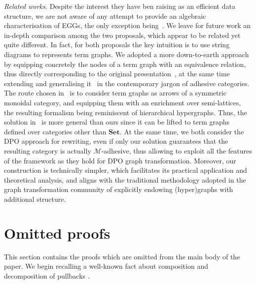 \documentclass[3p]{elsarticle}
\newcommand{\Set}{\mathbf{Set}}
\theoremstyle{remark}
\theoremstyle{definition}
\begin{document}
\emph{Related works.}
Despite the interest they have ben raising as an efficient data structure, we are not aware of any attempt to provide an 
algebraic characterisation of EGGs, the only exception being~\cite{ghica}. We leave for future work an in-depth comparison 
among the two proposals, which appear to be related yet quite different.
%
In fact, for both proposals the key intuition is  to use string diagrams to represents term graphs. We adopted a
more down-to-earth approach by equipping
concretely the nodes of a term graph with an equivalence relation, thus directly corresponding to the original presentation~\cite{DetlefsNS05},
at the same time extending and generalising it~\cite{concur2006} in the contemporary jargon of adhesive categories. 
The route chosen in~\cite{ghica} is to consider term graphs as arrows of a symmetric monoidal category,
and equipping them with an enrichment over semi-lattices, the resulting formalism being reminiscent of hierarchical hypergraphs.
Thus, the solution in~\cite{ghica}  is  more general than ours since it can be lifted to term graphs defined over categories other than
$\Set$. At the same time, we both consider the DPO approach for rewriting, even if only our solution guarantees that the resulting category
is actually $\mathcal{M}$-adhesive, thus allowing to exploit all the features of the framework
as they hold for DPO graph transformation.  Moreover, our construction is technically simpler, which facilitates its practical application 
and theoretical analysis, and aligns with the traditional methodology adopted in the graph transformation community 
of explicitly endowing (hyper)graphs with additional structure.





\appendix
\renewcommand{\thesection}{\Alph{section}}
\section{Omitted proofs}

This section contains the proofs which are omitted from the main body of the paper. 
%
We begin recalling  a well-known fact about composition and decomposition of pullbacks \cite[Lem.~1.1]{lack2005adhesive}.
\end{document}
